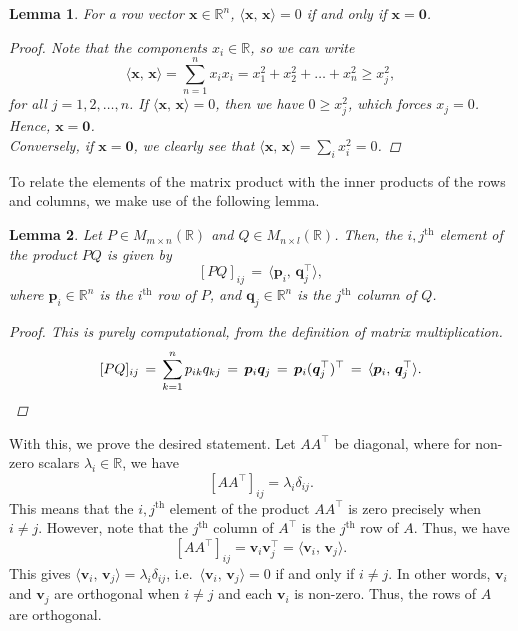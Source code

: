\documentclass[10pt]{article}
\def\x{\bm{x}}
\def\v{\bm{v}}
\def\p{\bm{p}}
\def\q{\bm{q}}
\newcommand\ip[2]{\langle #1,\, #2 \rangle}
\newtheorem{lemma}{Lemma}
\begin{document}
        \begin{lemma}
                For a row vector $\x \in \mathbb{R}^n$, $\ip{\x}{\x} = 0$ if and only if $\x = \mathbf{0}$.
                \begin{proof}
                        Note that the components $x_i \in \mathbb{R}$, so we can write
                        \[
                                \ip\x\x = \sum_{n = 1}^n x_i x_i = x_1^2 + x_2^2 + \dots + x_n^2 \geq x_j^2,
                        \]
                        for all $j = 1, 2, \dots, n$. If $\ip\x\x = 0$, then we have $0 \geq x_j^2$, which forces $x_j = 0$.
                        Hence, $\x = \mathbf{0}$. \\

                        Conversely, if $\x = \mathbf{0}$, we clearly see that $\ip\x\x = \sum_i x_i^2 = 0$.
                \end{proof}
        \end{lemma}

        To relate the elements of the matrix product with the inner products of the rows and columns, we make use of the following lemma.
        \begin{lemma}
                Let $P \in M_{m \times n}(\mathbb{R})$ and $Q \in M_{n \times l}(\mathbb{R})$.
                Then, the $i, j^\text{th}$ element of the product $PQ$ is given by
                \[
                        [PQ]_{ij} \,=\, \ip{\p_i}{\q_j^\top},
                \]
                where $\p_i \in \mathbb{R}^n$ is the $i^\text{th}$ row of $P$, and $\q_j \in \mathbb{R}^n$ is the $j^\text{th}$
                column of $Q$.
                \begin{proof}
                        This is purely computational, from the definition of matrix multiplication.
                        \[
                                [PQ]_{ij} \,=\, \sum_{k = 1}^n p_{ik}q_{kj} \,=\, \p_i\q_j \,=\, \p_i (\q_j^\top)^\top \,=\, \ip{\p_i}{\q_j^\top}. \qedhere
                        \]
                \end{proof}
        \end{lemma}

        With this, we prove the desired statement. Let $A A^\top$ be diagonal, where for non-zero scalars $\lambda_i \in \mathbb{R}$, we have
        \[
                [A A^\top]_{ij} = \lambda_i \delta_{ij}.
        \]
        This means that the $i, j^\text{th}$ element of the product $A A^\top$ is zero precisely when $i \neq j$.
        However, note that the $j^\text{th}$ column of $A^\top$ is the $j^\text{th}$ row of $A$. Thus, we have
        \[
                [A A^\top]_{ij} = \v_i\v_j^\top = \ip{\v_i}{\v_j}.
        \]
        This gives $\ip{\v_i}{\v_j} = \lambda_i\delta_{ij}$, i.e.\ $\ip{\v_i}{\v_j} = 0$ if and only if $i \neq j$.
        In other words, $\v_i$ and $\v_j$ are orthogonal when $i \neq j$ and each $\v_i$ is non-zero.
        Thus, the rows of $A$ are orthogonal. \\
\end{document}

